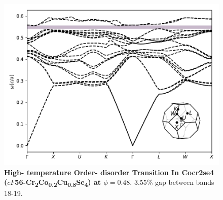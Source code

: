 \documentclass[fleqn,amsmath,amssymb,superscriptaddress, reprint,prl]{revtex4-1}
\begin{document}
\begin{figure}
\includegraphics[width=0.9\linewidth]{workspace/66e0ec72668d64d569344e95fba0d933/images/r=18.pdf}
	\caption{\textbf{High-  temperature Order-  disorder Transition In Cocr2se4 ($cF$56-Cr\textsubscript{2}Co\textsubscript{0}\textsubscript{.}\textsubscript{2}Cu\textsubscript{0}\textsubscript{.}\textsubscript{8}Se\textsubscript{4}) at $\phi=0.48$}. 3.55\% gap between bands 18-19.}
\end{figure}
\end{document}
